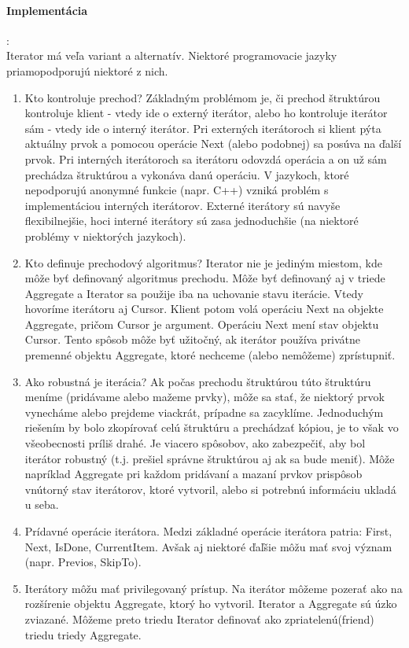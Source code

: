 			\paragraph{Implementácia}:\\

			Iterator má veľa variant a alternatív. Niektoré programovacie jazyky priamopodporujú niektoré z nich.
			\begin{enumerate}
				\item Kto kontroluje prechod? Základným problémom je, či prechod štruktúrou kontroluje klient - vtedy ide o externý iterátor, alebo ho kontroluje iterátor sám - vtedy ide o interný iterátor. Pri externých iterátoroch si klient pýta aktuálny prvok a pomocou operácie Next (alebo podobnej) sa posúva na ďalší prvok. Pri interných iterátoroch sa iterátoru odovzdá operácia a on už sám prechádza štruktúrou a vykonáva danú operáciu. V jazykoch, ktoré nepodporujú anonymné funkcie (napr. C++) vzniká problém s implementáciou interných iterátorov. Externé iterátory sú navyše flexibilnejšie, hoci interné iterátory sú zasa jednoduchšie (na niektoré problémy v niektorých jazykoch).
				\item Kto definuje prechodový algoritmus? Iterator nie je jediným miestom, kde môže byť definovaný algoritmus prechodu. Môže byť definovaný aj v triede Aggregate a Iterator sa použije iba na uchovanie stavu iterácie. Vtedy hovoríme iterátoru aj Cursor. Klient potom volá operáciu Next na objekte Aggregate, pričom Cursor je argument. Operáciu Next mení stav objektu Cursor. Tento spôsob môže byť užitočný, ak iterátor používa privátne premenné objektu Aggregate, ktoré nechceme (alebo nemôžeme) zprístupniť.
				\item Ako robustná je iterácia? Ak počas prechodu štruktúrou túto štruktúru meníme (pridávame alebo mažeme prvky), môže sa stať, že niektorý prvok vynecháme alebo prejdeme viackrát, prípadne sa zacyklíme. Jednoduchým riešením by bolo zkopírovať celú štruktúru a prechádzať kópiou, je to však vo všeobecnosti príliš drahé. Je viacero spôsobov, ako zabezpečiť, aby bol iterátor robustný (t.j. prešiel správne štruktúrou aj ak sa bude meniť). Môže napríklad Aggregate pri každom pridávaní a mazaní prvkov prispôsob vnútorný stav iterátorov, ktoré vytvoril, alebo si potrebnú informáciu ukladá u seba.
				\item Prídavné operácie iterátora. Medzi základné operácie iterátora patria: First, Next, IsDone, CurrentItem. Avšak aj niektoré ďaľšie môžu mať svoj význam (napr. Previos, SkipTo).
				\item Iterátory môžu mať privilegovaný prístup. Na iterátor môžeme pozerať ako na rozšírenie objektu Aggregate, ktorý ho vytvoril. Iterator a Aggregate sú úzko zviazané. Môžeme preto triedu Iterator definovať ako zpriatelenú(friend) triedu triedy Aggregate.

\end{enumerate}
